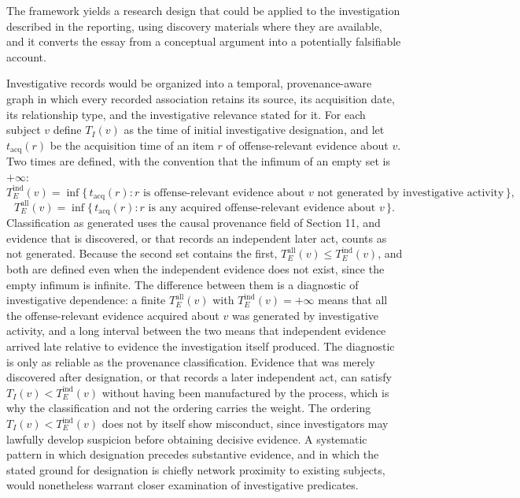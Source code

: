 \documentclass[11pt]{article}
\theoremstyle{definition}
\theoremstyle{remark}
\begin{document}
The framework yields a research design that could be applied to the investigation described in the reporting, using discovery materials where they are available, and it converts the essay from a conceptual argument into a potentially falsifiable account.

Investigative records would be organized into a temporal, provenance-aware graph in which every recorded association retains its source, its acquisition date, its relationship type, and the investigative relevance stated for it. For each subject $v$ define $T_I(v)$ as the time of initial investigative designation, and let $t_{\mathrm{acq}}(r)$ be the acquisition time of an item $r$ of offense-relevant evidence about $v$. Two times are defined, with the convention that the infimum of an empty set is $+\infty$:
\[
T_E^{\mathrm{ind}}(v) = \inf\{\, t_{\mathrm{acq}}(r) : r \text{ is offense-relevant evidence about } v \text{ not generated by investigative activity} \,\},
\]
\[
T_E^{\mathrm{all}}(v) = \inf\{\, t_{\mathrm{acq}}(r) : r \text{ is any acquired offense-relevant evidence about } v \,\}.
\]
Classification as generated uses the causal provenance field of Section 11, and evidence that is discovered, or that records an independent later act, counts as not generated. Because the second set contains the first, $T_E^{\mathrm{all}}(v) \le T_E^{\mathrm{ind}}(v)$, and both are defined even when the independent evidence does not exist, since the empty infimum is infinite. The difference between them is a diagnostic of investigative dependence: a finite $T_E^{\mathrm{all}}(v)$ with $T_E^{\mathrm{ind}}(v) = +\infty$ means that all the offense-relevant evidence acquired about $v$ was generated by investigative activity, and a long interval between the two means that independent evidence arrived late relative to evidence the investigation itself produced. The diagnostic is only as reliable as the provenance classification. Evidence that was merely discovered after designation, or that records a later independent act, can satisfy $T_I(v) < T_E^{\mathrm{ind}}(v)$ without having been manufactured by the process, which is why the classification and not the ordering carries the weight. The ordering $T_I(v) < T_E^{\mathrm{ind}}(v)$ does not by itself show misconduct, since investigators may lawfully develop suspicion before obtaining decisive evidence. A systematic pattern in which designation precedes substantive evidence, and in which the stated ground for designation is chiefly network proximity to existing subjects, would nonetheless warrant closer examination of investigative predicates.
\end{document}
